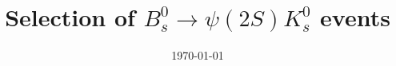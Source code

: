 


\title{Selection of \texorpdfstring{$B_s^0\to\psi(2S)K^0_s$}{Bs0Psi2SKs0} events}
\date{%
   \today %
}



\maketitle
\thispagestyle{empty}
\tableofcontents
\newpage





\printbibliography{}


